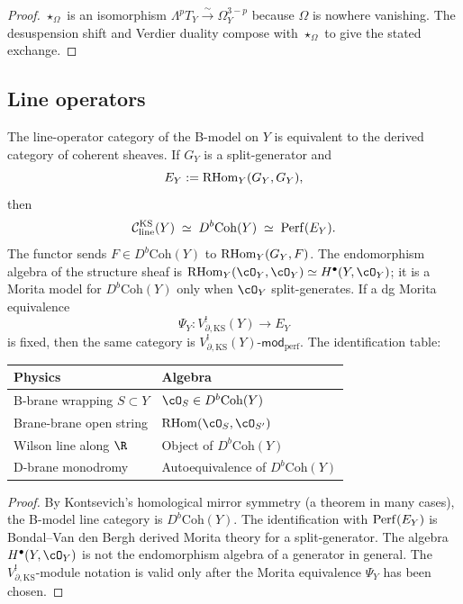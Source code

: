 \begin{proof}
$\star_\Omega$ is an isomorphism $\Lambda^p T_Y \xrightarrow{\sim}
\Omega^{3-p}_Y$ because $\Omega$ is nowhere vanishing. The
desuspension shift and Verdier duality compose with $\star_\Omega$
to give the stated exchange.
\end{proof}


\subsection{Line operators}

\begin{theorem}
\label{thm:thqg-ks-lines}
The line-operator category of the B-model on $Y$ is equivalent to the
derived category of coherent sheaves. If $G_Y$ is a split-generator and
\[
 E_Y:=\operatorname{RHom}_Y(G_Y,G_Y),
\]
then
\begin{equation}%
\mathcal{C}_{\mathrm{line}}^{\mathrm{KS}}(Y)
\;\simeq\;
D^b \mathrm{Coh}(Y)
\;\simeq\;
\Perf(E_Y).
\end{equation}
The functor sends $F\in D^b\mathrm{Coh}(Y)$ to
$\operatorname{RHom}_Y(G_Y,F)$. The endomorphism algebra of the structure sheaf is
$\RHom_Y(\cO_Y,\cO_Y)\simeq H^\bullet(Y,\cO_Y)$; it is a Morita model
for $D^b\mathrm{Coh}(Y)$ only when $\cO_Y$ split-generates. If a dg
Morita equivalence
\[
 \Psi_Y\colon V_{\partial,\mathrm{KS}}^!(Y)\longrightarrow E_Y
\]
is fixed, then the same category is
$V_{\partial,\mathrm{KS}}^!(Y)\text{-}\mathsf{mod}_{\mathrm{perf}}$.
The identification table:
\begin{center}
\renewcommand{\arraystretch}{1.2}
\small
\begin{tabular}{ll}
\textbf{Physics} & \textbf{Algebra} \\
\hline
B-brane wrapping $S \subset Y$ & $\cO_S \in D^b\mathrm{Coh}(Y)$ \\
Brane-brane open string & $\RHom(\cO_S, \cO_{S'})$ \\
Wilson line along $\R$ & Object of $D^b\mathrm{Coh}(Y)$ \\
D-brane monodromy & Autoequivalence of $D^b\mathrm{Coh}(Y)$
\end{tabular}
\end{center}
\end{theorem}

\begin{proof}
By Kontsevich's homological mirror symmetry (a theorem in many cases),
the B-model line category is $D^b\mathrm{Coh}(Y)$. The identification
with $\operatorname{Perf}(E_Y)$ is Bondal--Van den Bergh derived Morita theory for a
split-generator. The algebra $H^\bullet(Y,\cO_Y)$ is not the
endomorphism algebra of a generator in general. The
$V^!_{\partial,\mathrm{KS}}$-module notation is valid only after the
Morita equivalence $\Psi_Y$ has been chosen.
\end{proof}


